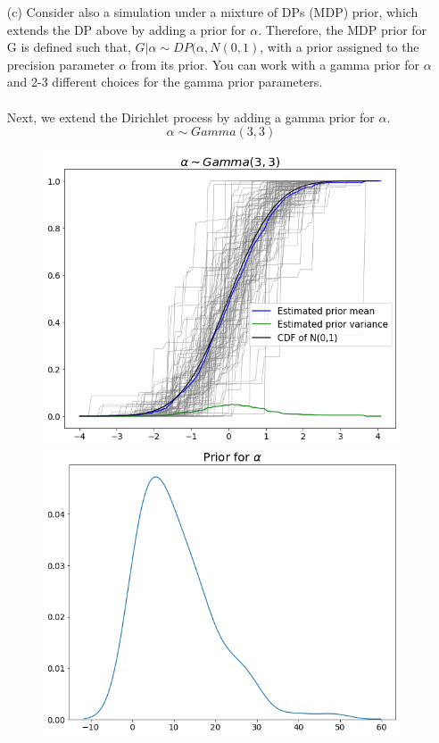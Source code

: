 \documentclass[a4paper, 10pt]{article}
\begin{document}
\begin{enumerate}
\begin{enumerate}
        \item[(c)] Consider also a simulation under a mixture of DPs (MDP) prior, which extends the DP above by adding a prior for $\alpha$. Therefore, the MDP prior for G is defined such that, $G|\alpha \sim DP(\alpha, N(0,1)$, with a prior assigned to the precision parameter $\alpha$ from its prior. You can work with a gamma prior for $\alpha$ and 2-3 different choices for the gamma prior parameters.\\\\
        Next, we extend the Dirichlet process by adding a gamma prior for $\alpha$. 
        $$\alpha \sim Gamma(3,3)$$
        \begin{figure}[h!]
            \centering
            \includegraphics[scale = 0.4]{c1-1.png}\includegraphics[scale = 0.4]{c1-2.png}

\end{figure}
\end{enumerate}
\end{enumerate}
\end{document}
